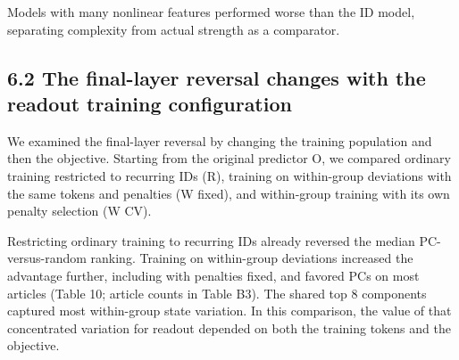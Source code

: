 Models with many nonlinear features performed worse than the ID model, separating complexity from actual strength as a comparator.

\FloatBarrier

\subsection{6.2 The final-layer reversal changes with the readout training configuration}\label{the-final-layer-reversal-changes-with-the-readout-training-configuration}

We examined the final-layer reversal by changing the training population and then the objective. Starting from the original predictor O, we compared ordinary training restricted to recurring IDs (R), training on within-group deviations with the same tokens and penalties (W fixed), and within-group training with its own penalty selection (W CV).

Restricting ordinary training to recurring IDs already reversed the median PC-versus-random ranking. Training on within-group deviations increased the advantage further, including with penalties fixed, and favored PCs on most articles (Table 10; article counts in Table B3). The shared top 8 components captured most within-group state variation. In this comparison, the value of that concentrated variation for readout depended on both the training tokens and the objective.

